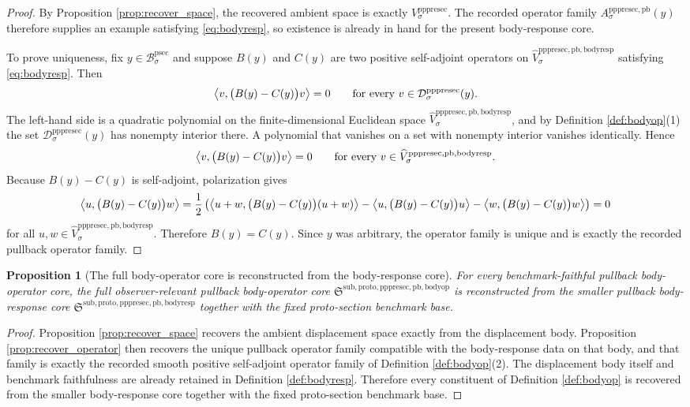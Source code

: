 \documentclass[11pt]{article}
\newcommand{\ProtoSectionBody}[1]{\mathcal B_{#1}^{\mathrm{psec}}}
\newcommand{\PrePreProtoSectionVertical}[1]{V_{#1}^{\mathrm{pppresec}}}
\newcommand{\PrePreProtoSectionResidualBody}[1]{\mathcal D_{#1}^{\mathrm{pppresec}}}
\newcommand{\PrePreProtoSectionPullbackOperator}[1]{A_{#1}^{\mathrm{pppresec,pb}}}
\newcommand{\PullbackBodyOperatorCore}{\mathfrak S^{\mathrm{sub,proto,pppresec,pb,bodyop}}}
\newcommand{\PullbackBodyResponseCore}{\mathfrak S^{\mathrm{sub,proto,pppresec,pb,bodyresp}}}
\newcommand{\RecoveredBodyResponseSpace}[1]{\widehat V_{#1}^{\mathrm{pppresec,pb,bodyresp}}}
\newtheorem{proposition}{Proposition}
\begin{document}
\begin{proof}
By Proposition \ref{prop:recover_space}, the recovered ambient space is exactly \(\PrePreProtoSectionVertical{\sigma}\). The recorded operator family \(\PrePreProtoSectionPullbackOperator{\sigma}(y)\) therefore supplies an example satisfying \eqref{eq:bodyresp}, so existence is already in hand for the present body-response core.

To prove uniqueness, fix \(y\in\ProtoSectionBody{\sigma}\) and suppose \(B(y)\) and \(C(y)\) are two positive self-adjoint operators on \(\RecoveredBodyResponseSpace{\sigma}\) satisfying \eqref{eq:bodyresp}. Then
\[
\ev{v,\bigl(B(y)-C(y)\bigr)v}=0
\qquad
\text{for every }
v\in\PrePreProtoSectionResidualBody{\sigma}(y).
\]
The left-hand side is a quadratic polynomial on the finite-dimensional Euclidean space \(\RecoveredBodyResponseSpace{\sigma}\), and by Definition \ref{def:bodyop}(1) the set \(\PrePreProtoSectionResidualBody{\sigma}(y)\) has nonempty interior there. A polynomial that vanishes on a set with nonempty interior vanishes identically. Hence
\[
\ev{v,\bigl(B(y)-C(y)\bigr)v}=0
\qquad
\text{for every }
v\in\RecoveredBodyResponseSpace{\sigma}.
\]
Because \(B(y)-C(y)\) is self-adjoint, polarization gives
\[
\ev{u,\bigl(B(y)-C(y)\bigr)w}
=
\frac{1}{2}
\left(
\ev{u+w,\bigl(B(y)-C(y)\bigr)(u+w)}
-\ev{u,\bigl(B(y)-C(y)\bigr)u}
-\ev{w,\bigl(B(y)-C(y)\bigr)w}
\right)
=0
\]
for all \(u,w\in\RecoveredBodyResponseSpace{\sigma}\). Therefore \(B(y)=C(y)\). Since \(y\) was arbitrary, the operator family is unique and is exactly the recorded pullback operator family.
\end{proof}

\begin{proposition}[The full body-operator core is reconstructed from the body-response core]
\label{prop:reconstruct}
For every benchmark-faithful pullback body-operator core, the full observer-relevant pullback body-operator core \(\PullbackBodyOperatorCore\) is reconstructed from the smaller pullback body-response core \(\PullbackBodyResponseCore\) together with the fixed proto-section benchmark base.
\end{proposition}

\begin{proof}
Proposition \ref{prop:recover_space} recovers the ambient displacement space exactly from the displacement body. Proposition \ref{prop:recover_operator} then recovers the unique pullback operator family compatible with the body-response data on that body, and that family is exactly the recorded smooth positive self-adjoint operator family of Definition \ref{def:bodyop}(2). The displacement body itself and benchmark faithfulness are already retained in Definition \ref{def:bodyresp}. Therefore every constituent of Definition \ref{def:bodyop} is recovered from the smaller body-response core together with the fixed proto-section benchmark base.
\end{proof}
\end{document}
